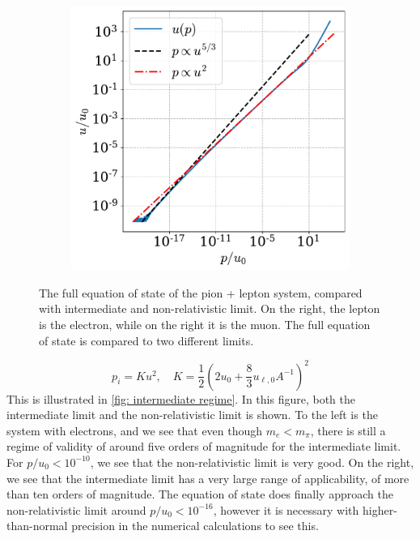 \begin{figure}[!htb]
\begin{subfigure}{0.49\textwidth}
        \includegraphics[width=\textwidth]{../scripts/figurer/charge_neutrality/eos_lepton_limitsmu.pdf}
    \end{subfigure}
    \caption{
        The full equation of state of the pion + lepton system, compared with intermediate and non-relativistic limit.
    On the right, the lepton is the electron, while on the right it is the muon.
    The full equation of state is compared to two different limits.
    }
    \label{fig: intermediate regime}
\end{figure}
%
\begin{equation}
    p_i = K u^2, \quad 
    K = \frac{1}{2} \left(2 u_0 + \frac{8}{3} u_{\ell,0} A^{-1} \right)^2
\end{equation}
%
This is illustrated in \autoref{fig: intermediate regime}.
In this figure, both the intermediate limit and the non-relativistic limit is shown.
To the left is the system with electrons, and we see that even though $m_e < m_\pi$, there is still a regime of validity of around five orders of magnitude for the intermediate limit.
For $p/u_0 < 10^{-10}$, we see that the non-relativistic limit is very good.
On the right, we see that the intermediate limit has a very large range of applicability, of more than ten orders of magnitude.
The equation of state does finally approach the non-relativistic limit around $p/u_0 < 10^{-16}$, however it is necessary with higher-than-normal precision in the numerical calculations to see this.
 


